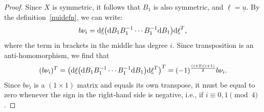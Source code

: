 \documentclass[pdftex]{sigma}%
\numberwithin{equation}{section}
\newcommand{\0}{\color{blue}{\mathsf{0}}}
\begin{document}
\begin{proof} Since $X$ is symmetric, it follows that $B_1$ is also symmetric, and $\underline{\ell}= \underline{u}$. By the definition~\eqref{nuidefn}, we can write:
\begin{gather*}
 b \nu_i = {\rm d} \underline{\ell} \big({\rm d}B_1 B_1^{-1} \cdots B_1^{-1} {\rm d}B_1 \big) {\rm d} \underline{\ell}^T,
 \end{gather*}
 where the term in brackets in the middle has degree $i$. Since transposition is an anti-ho\-mo\-mor\-phism, we find that
\begin{gather*}
 (b \nu_i)^T = \big({\rm d}\underline{\ell} \big({\rm d}B_1 B_1^{-1} \cdots B_1^{-1} {\rm d}B_1 \big) {\rm d} \underline{\ell}^T \big)^T = (-1)^{\frac{(i+2)(i+1)}{2}} b \nu_i.
 \end{gather*}
 Since
$b \nu_i$ is a $(1\times 1)$ matrix and equals its own transpose, it must be equal to zero whenever the sign in the right-hand side is negative, i.e., if $i\equiv 0,1 \pmod 4$.
\end{proof}
\end{document}
